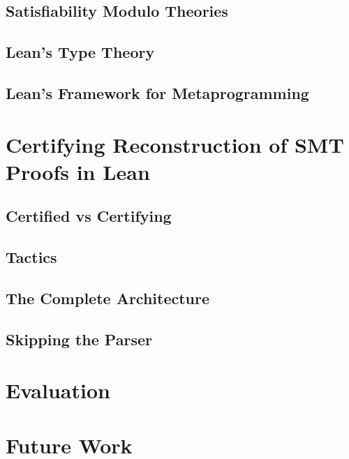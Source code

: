 \documentclass[
	msc,
	english
]{ppgccufmg}
\begin{document}
	  \section{Satisfiability Modulo Theories}
	  \section{Lean's Type Theory}
	  \section{Lean's Framework for Metaprogramming}
	\chapter{Certifying Reconstruction of SMT Proofs in Lean}
	  \section{Certified vs Certifying}
	  \section{Tactics}
	  \section{The Complete Architecture}
	  \section{Skipping the Parser}
	\chapter{Evaluation}
	\chapter{Future Work}


\end{document}
